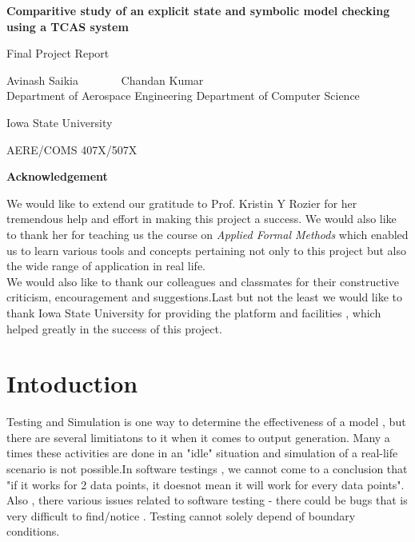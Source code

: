 \documentclass[a4paper,11pt,flegn]{article}
\newcommand{\institution}{Iowa State University}
\newcommand{\pagetitle}{Comparitive study of an explicit state and symbolic model checking using a TCAS system}
\newcommand{\coursecode}{AERE/COMS 407X/507X}
\newcommand{\authora}{Avinash Saikia}
\newcommand{\authorb}{Chandan Kumar}
\newcommand{\depta}{Department of Aerospace Engineering}
\newcommand{\deptb}{Department of Computer Science}
\begin{document}
\begin{center}
\large\textbf{\pagetitle}
\end{center}

\begin{center}
\vspace{5 cm}
\begin{center}
\large{Final Project Report}
\end{center}
\vspace{5cm}
\authora \hspace{90pt} \ \ \ \ \ \ \  \authorb \\
\depta \hspace{20pt} \deptb
\begin{center}

\end{center}
\institution
\end{center}

\begin{center}
\coursecode
\end{center}


\newpage
\begin{center}
\Large\textbf{Acknowledgement}\\
\end{center}
\vspace{1 cm}
We would like to extend our gratitude to Prof. Kristin Y Rozier for her tremendous help and effort in making this project a success. We would also like to thank her for teaching us the course on \textit{Applied Formal Methods} which enabled us to learn various tools and concepts  pertaining not only to this project but also the wide range of application in real life. \\

We would also like to thank our colleagues and classmates for their constructive criticism, encouragement and suggestions.Last but not the least we would like to thank Iowa State University for providing the platform and facilities , which helped greatly in the success of this project.
\newpage
\tableofcontents
\newpage
\section{Intoduction}
\vspace{0.3 cm}
Testing and Simulation is one way to determine the effectiveness of a model , but there are several limitiatons to it when it comes to output generation. Many a times these activities are done in an "idle" situation and simulation of a real-life scenario is not possible.In software testings , we cannot come to a conclusion that "if it works for 2 data points, it doesnot mean it will work for every data points". Also , there various issues related to software testing - there could be bugs that is very difficult to find/notice . Testing cannot solely depend of boundary conditions.\\
\end{document}
